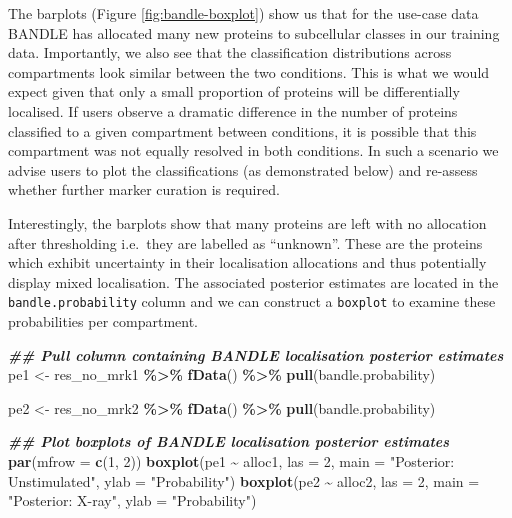 \documentclass[9pt,a4paper,]{extarticle}
\newenvironment{Shaded}{\begin{snugshade}}{\end{snugshade}}
\newcommand{\AttributeTok}[1]{\textcolor[rgb]{0.13,0.29,0.53}{#1}}
\newcommand{\DecValTok}[1]{\textcolor[rgb]{0.00,0.00,0.81}{#1}}
\newcommand{\DocumentationTok}[1]{\textcolor[rgb]{0.56,0.35,0.01}{\textbf{\textit{#1}}}}
\newcommand{\FunctionTok}[1]{\textcolor[rgb]{0.13,0.29,0.53}{\textbf{#1}}}
\newcommand{\NormalTok}[1]{#1}
\newcommand{\OtherTok}[1]{\textcolor[rgb]{0.56,0.35,0.01}{#1}}
\newcommand{\SpecialCharTok}[1]{\textcolor[rgb]{0.81,0.36,0.00}{\textbf{#1}}}
\newcommand{\StringTok}[1]{\textcolor[rgb]{0.31,0.60,0.02}{#1}}
\begin{document}
The barplots (Figure \ref{fig:bandle-boxplot}) show us that for the use-case data BANDLE has allocated many new
proteins to subcellular classes in our training data. Importantly, we also see
that the classification distributions across compartments look similar between
the two conditions. This is what we would expect given that only a small proportion
of proteins will be differentially localised. If users observe a dramatic difference
in the number of proteins classified to a given compartment between conditions, it
is possible that this compartment was not equally resolved in both conditions. In
such a scenario we advise users to plot the classifications (as demonstrated
below) and re-assess whether further marker curation is required.

Interestingly, the barplots show that many proteins are left with no allocation
after thresholding i.e.~they are labelled as ``unknown''. These are the proteins
which exhibit uncertainty in their localisation allocations and thus potentially
display mixed localisation. The associated posterior estimates are located in the
\texttt{bandle.probability} column and we can construct a \texttt{boxplot} to examine these
probabilities per compartment.

\begin{Shaded}
\begin{Highlighting}[]
\DocumentationTok{\#\# Pull column containing BANDLE localisation posterior estimates}
\NormalTok{pe1 }\OtherTok{\textless{}{-}}\NormalTok{ res\_no\_mrk1 }\SpecialCharTok{\%\textgreater{}\%}
  \FunctionTok{fData}\NormalTok{() }\SpecialCharTok{\%\textgreater{}\%}
  \FunctionTok{pull}\NormalTok{(bandle.probability)}
  
\NormalTok{pe2 }\OtherTok{\textless{}{-}}\NormalTok{ res\_no\_mrk2 }\SpecialCharTok{\%\textgreater{}\%}
  \FunctionTok{fData}\NormalTok{() }\SpecialCharTok{\%\textgreater{}\%}
  \FunctionTok{pull}\NormalTok{(bandle.probability)}

\DocumentationTok{\#\# Plot boxplots of BANDLE localisation posterior estimates}
\FunctionTok{par}\NormalTok{(}\AttributeTok{mfrow =} \FunctionTok{c}\NormalTok{(}\DecValTok{1}\NormalTok{, }\DecValTok{2}\NormalTok{))}
\FunctionTok{boxplot}\NormalTok{(pe1 }\SpecialCharTok{\textasciitilde{}}\NormalTok{ alloc1, }\AttributeTok{las =} \DecValTok{2}\NormalTok{, }\AttributeTok{main =} \StringTok{"Posterior: Unstimulated"}\NormalTok{,}
        \AttributeTok{ylab =} \StringTok{"Probability"}\NormalTok{)}
\FunctionTok{boxplot}\NormalTok{(pe2 }\SpecialCharTok{\textasciitilde{}}\NormalTok{ alloc2, }\AttributeTok{las =} \DecValTok{2}\NormalTok{, }\AttributeTok{main =} \StringTok{"Posterior: X{-}ray"}\NormalTok{,}
        \AttributeTok{ylab =} \StringTok{"Probability"}\NormalTok{)}
\end{Highlighting}
\end{Shaded}
\end{document}
